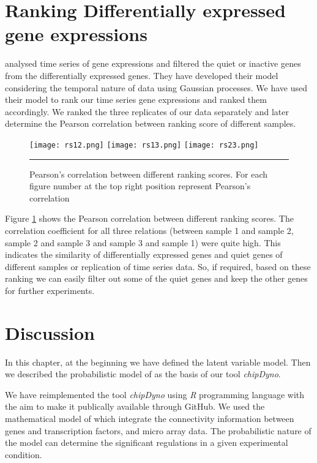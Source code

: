 \section{Ranking Differentially expressed gene expressions}
\cite{Kalaitzis:2011} analysed time series of gene expressions and filtered the quiet or inactive genes from the differentially expressed genes. They have developed their model considering the temporal nature of data using Gaussian processes. We have used their model to rank our time series gene expressions and ranked them accordingly. We ranked the three replicates of our data separately and later determine the Pearson correlation between ranking score of different samples.
\begin{figure}
	\centering
		\texttt{[image: rs12.png]}
		\texttt{[image: rs13.png]}
		\texttt{[image: rs23.png]}
		\rule{35em}{0.5pt}
	\caption[Pearson's correlation between different ranking scores]
		{Pearson's correlation between different ranking scores. For each figure number at the top right position represent Pearson's correlation}
	\label{fig:ranking_scores}
\end{figure}

Figure \ref{fig:ranking_scores} shows the Pearson correlation between different ranking scores. The correlation coefficient for all three relations (between sample 1 and sample 2, sample 2 and sample 3 and sample 3 and sample 1) were quite high. This indicates the similarity of differentially expressed genes and quiet genes of different samples or replication of time series data. So, if required, based on these ranking we can easily filter out some of the quiet genes and keep the other genes for further experiments.

\section{Discussion}
In this chapter, at the beginning we have defined the latent variable model. Then we described the probabilistic model of \cite{Sanguinetti:2006} as the basis of our tool \emph{chipDyno}.

We have reimplemented the tool \emph{chipDyno} using \emph{R} programming language with the aim to make it publically available through GitHub. We used the mathematical model of \cite{Sanguinetti:2006} which integrate the connectivity information between genes and transcription factors, and micro array data. The probabilistic nature of the model can determine the significant regulations in a given experimental condition.

